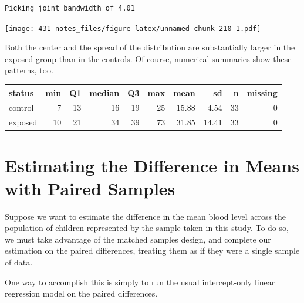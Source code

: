 \documentclass[
]{book}
\newenvironment{Shaded}{\begin{snugshade}}{\end{snugshade}}
\newcommand{\DataTypeTok}[1]{\textcolor[rgb]{0.13,0.29,0.53}{#1}}
\newcommand{\DecValTok}[1]{\textcolor[rgb]{0.00,0.00,0.81}{#1}}
\newcommand{\FloatTok}[1]{\textcolor[rgb]{0.00,0.00,0.81}{#1}}
\newcommand{\KeywordTok}[1]{\textcolor[rgb]{0.13,0.29,0.53}{\textbf{#1}}}
\newcommand{\NormalTok}[1]{#1}
\newcommand{\OperatorTok}[1]{\textcolor[rgb]{0.81,0.36,0.00}{\textbf{#1}}}
\newcommand{\OtherTok}[1]{\textcolor[rgb]{0.56,0.35,0.01}{#1}}
\newcommand{\StringTok}[1]{\textcolor[rgb]{0.31,0.60,0.02}{#1}}
\begin{document}
\begin{verbatim}
Picking joint bandwidth of 4.01
\end{verbatim}

\texttt{[image: 431-notes\_files/figure-latex/unnamed-chunk-210-1.pdf]}

Both the center and the spread of the distribution are substantially larger in the exposed group than in the controls. Of course, numerical summaries show these patterns, too.

\begin{Shaded}
\end{Shaded}

\begin{tabular}{l|r|r|r|r|r|r|r|r|r}
\hline
status & min & Q1 & median & Q3 & max & mean & sd & n & missing\\
\hline
control & 7 & 13 & 16 & 19 & 25 & 15.88 & 4.54 & 33 & 0\\
\hline
exposed & 10 & 21 & 34 & 39 & 73 & 31.85 & 14.41 & 33 & 0\\
\hline
\end{tabular}

\hypertarget{estimating-the-difference-in-means-with-paired-samples}{%
\section{Estimating the Difference in Means with Paired Samples}\label{estimating-the-difference-in-means-with-paired-samples}}

Suppose we want to estimate the difference in the mean blood level across the population of children represented by the sample taken in this study. To do so, we must take advantage of the matched samples design, and complete our estimation on the paired differences, treating them as if they were a single sample of data.

One way to accomplish this is simply to run the usual intercept-only linear regression model on the paired differences.

\begin{Shaded}
\end{Shaded}
\end{document}
